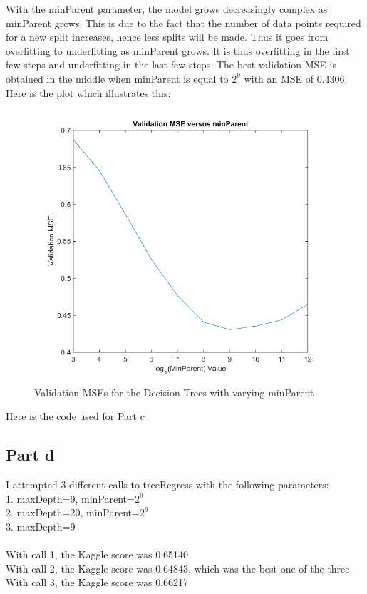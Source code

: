 \documentclass[twoside,11pt]{article}
\theoremstyle{definition}
\begin{document}
With the minParent parameter, the model grows decreasingly complex as minParent grows. This is due to the fact that the number of data points required for a new split increases, hence less splits will be made. Thus it goes from overfitting to underfitting as minParent grows. It is thus overfitting in the first few steps and underfitting in the last few steps. The best validation MSE is obtained in the middle when minParent is equal to $2^9$ with an MSE of 0.4306. Here is the plot which illustrates this:

\begin{figure}[h]
\centering
\includegraphics[width=6 in]{prob3plot2.png}
\caption{Validation MSEs for the Decision Trees with varying minParent}
\end{figure}

\newpage

Here is the code used for Part c\\


\newpage

\subsection*{Part d}

I attempted 3 different calls to treeRegress with the following parameters:\\
1. maxDepth=9, minParent=$2^9$\\
2. maxDepth=20, minParent=$2^9$\\
3. maxDepth=9\\
\\
With call 1, the Kaggle score was 0.65140\\
With call 2, the Kaggle score was 0.64843, which was the best one of the three\\
With call 3, the Kaggle score was 0.66217\\
\end{document}
